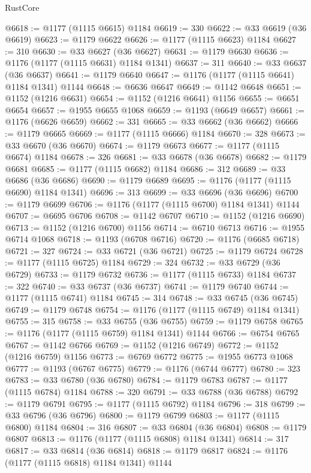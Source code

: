 \begin{lexlean}{RustCore}
\begin{coremodule}
@6618 := @1177 (@1115 @6615) @1184
@6619 := 330
@6622 := @33 @6619 (@36 @6619)
@6623 := @1179 @6622
@6626 := @1177 (@1115 @6623) @1184
@6627 := 310
@6630 := @33 @6627 (@36 @6627)
@6631 := @1179 @6630
@6636 := @1176 (@1177 (@1115 @6631) @1184 @1341)
@6637 := 311
@6640 := @33 @6637 (@36 @6637)
@6641 := @1179 @6640
@6647 := @1176 (@1177 (@1115 @6641) @1184 @1341) @1144
@6648 := @6636 @6647
@6649 := @1142 @6648
@6651 := @1152 (@1216 @6631)
@6654 := @1152 (@1216 @6641) @1156
@6655 := @6651 @6654
@6657 := @1955 @6655 @1068
@6659 := @1193 (@6649 @6657)
@6661 := @1176 (@6626 @6659)
@6662 := 331
@6665 := @33 @6662 (@36 @6662)
@6666 := @1179 @6665
@6669 := @1177 (@1115 @6666) @1184
@6670 := 328
@6673 := @33 @6670 (@36 @6670)
@6674 := @1179 @6673
@6677 := @1177 (@1115 @6674) @1184
@6678 := 326
@6681 := @33 @6678 (@36 @6678)
@6682 := @1179 @6681
@6685 := @1177 (@1115 @6682) @1184
@6686 := 312
@6689 := @33 @6686 (@36 @6686)
@6690 := @1179 @6689
@6695 := @1176 (@1177 (@1115 @6690) @1184 @1341)
@6696 := 313
@6699 := @33 @6696 (@36 @6696)
@6700 := @1179 @6699
@6706 := @1176 (@1177 (@1115 @6700) @1184 @1341) @1144
@6707 := @6695 @6706
@6708 := @1142 @6707
@6710 := @1152 (@1216 @6690)
@6713 := @1152 (@1216 @6700) @1156
@6714 := @6710 @6713
@6716 := @1955 @6714 @1068
@6718 := @1193 (@6708 @6716)
@6720 := @1176 (@6685 @6718)
@6721 := 327
@6724 := @33 @6721 (@36 @6721)
@6725 := @1179 @6724
@6728 := @1177 (@1115 @6725) @1184
@6729 := 324
@6732 := @33 @6729 (@36 @6729)
@6733 := @1179 @6732
@6736 := @1177 (@1115 @6733) @1184
@6737 := 322
@6740 := @33 @6737 (@36 @6737)
@6741 := @1179 @6740
@6744 := @1177 (@1115 @6741) @1184
@6745 := 314
@6748 := @33 @6745 (@36 @6745)
@6749 := @1179 @6748
@6754 := @1176 (@1177 (@1115 @6749) @1184 @1341)
@6755 := 315
@6758 := @33 @6755 (@36 @6755)
@6759 := @1179 @6758
@6765 := @1176 (@1177 (@1115 @6759) @1184 @1341) @1144
@6766 := @6754 @6765
@6767 := @1142 @6766
@6769 := @1152 (@1216 @6749)
@6772 := @1152 (@1216 @6759) @1156
@6773 := @6769 @6772
@6775 := @1955 @6773 @1068
@6777 := @1193 (@6767 @6775)
@6779 := @1176 (@6744 @6777)
@6780 := 323
@6783 := @33 @6780 (@36 @6780)
@6784 := @1179 @6783
@6787 := @1177 (@1115 @6784) @1184
@6788 := 320
@6791 := @33 @6788 (@36 @6788)
@6792 := @1179 @6791
@6795 := @1177 (@1115 @6792) @1184
@6796 := 318
@6799 := @33 @6796 (@36 @6796)
@6800 := @1179 @6799
@6803 := @1177 (@1115 @6800) @1184
@6804 := 316
@6807 := @33 @6804 (@36 @6804)
@6808 := @1179 @6807
@6813 := @1176 (@1177 (@1115 @6808) @1184 @1341)
@6814 := 317
@6817 := @33 @6814 (@36 @6814)
@6818 := @1179 @6817
@6824 := @1176 (@1177 (@1115 @6818) @1184 @1341) @1144

\end{coremodule}
\end{lexlean}
